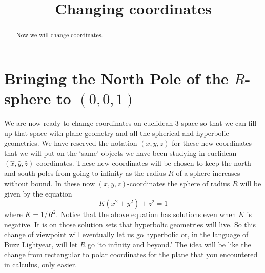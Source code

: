 \documentclass[newpage,hints,handout]{ximera}
\title{Changing coordinates}
\begin{document}
\begin{abstract}
Now we will change coordinates.
\end{abstract}
\maketitle


\section{Bringing the North Pole of the $R$-sphere to $\left(
0,0,1\right)  $}

We are now ready to change coordinates on euclidean $3$-space so that we can fill
up that space  with plane geometry and all the spherical and hyperbolic
geometries.  We have reserved the notation $(x,y,z)$ for these new coordinates
that we will put on the `same' objects we have been studying in euclidean
$(\hat{x},\hat{y},\hat{z})$-coordinates. These new coordinates will be chosen to
keep the north and south poles from going to infinity as the radius $R$ of a
sphere increases without bound. In these now $(x,y,z)$-coordinates the sphere of
radius $R$ will be given by the equation
\[
K(x^{2}+y^{2})+z^{2}=1
\]
where $K=1/R^2$. Notice that the above equation has solutions even when $K$ is negative. It is on those solution sets that hyperbolic geometries will live. So this change of
viewpoint will eventually let us go hyperbolic or, in the language of Buzz
Lightyear, will let $R$ go `to infinity and beyond.' The
idea will be like the change from rectangular to polar coordinates for the
plane that you encountered in calculus, only easier. 
\end{document}
